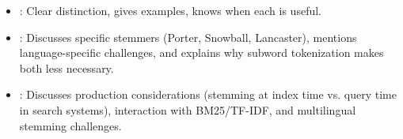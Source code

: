 \begin{interviewq}

\goodgreat
\begin{itemize}
    \item {}: Clear distinction, gives examples, knows when each is useful.
    \item {}: Discusses specific stemmers (Porter, Snowball, Lancaster), mentions
    language-specific challenges, and explains why subword tokenization makes both less
    necessary.
    \item {}: Discusses production considerations (stemming at index time
    vs. query time in search systems), interaction with BM25/TF-IDF, and multilingual
    stemming challenges.
\end{itemize}

\end{interviewq}

\vspace{0.5em}

